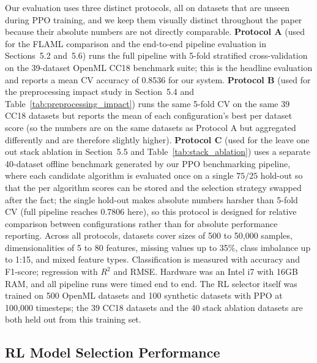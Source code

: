 \documentclass{article}
\begin{document}
Our evaluation uses three distinct protocols, all on datasets that are
unseen during PPO training, and we keep them visually distinct throughout
the paper because their absolute numbers are not directly comparable.
\textbf{Protocol A} (used for the FLAML comparison and the end-to-end
pipeline evaluation in Sections~5.2 and~5.6) runs the full pipeline with
5-fold stratified cross-validation on the 39-dataset OpenML CC18 benchmark
suite; this is the headline evaluation and reports a mean CV accuracy of
0.8536 for our system. \textbf{Protocol B} (used for the preprocessing
impact study in Section~5.4 and Table~\ref{tab:preprocessing_impact}) runs
the same 5-fold CV on the same 39 CC18 datasets but reports the mean of
each configuration's best per dataset score (so the numbers are on the
same datasets as Protocol A but aggregated differently and are therefore
slightly higher). \textbf{Protocol C} (used for the leave one out stack
ablation in Section~5.5 and Table~\ref{tab:stack_ablation}) uses a separate
40-dataset offline benchmark generated by our PPO benchmarking pipeline,
where each candidate algorithm is evaluated once on a single $75/25$ hold-out
so that the per algorithm scores can be stored and the selection strategy
swapped after the fact; the single hold-out makes absolute numbers harsher
than 5-fold CV (full pipeline reaches 0.7806 here), so this protocol is
designed for relative comparison between configurations rather than for
absolute performance reporting. Across all protocols, datasets cover sizes
of 500 to 50{,}000 samples, dimensionalities of 5 to 80 features, missing
values up to 35\%, class imbalance up to 1:15, and mixed feature types.
Classification is measured with accuracy and F1-score; regression with
$R^2$ and RMSE. Hardware was an Intel i7 with 16GB RAM, and all pipeline
runs were timed end to end. The RL selector itself was trained on 500
OpenML datasets and 100 synthetic datasets with PPO at 100{,}000
timesteps; the 39 CC18 datasets and the 40 stack ablation datasets are
both held out from this training set.

\subsection{RL Model Selection Performance}
\end{document}
